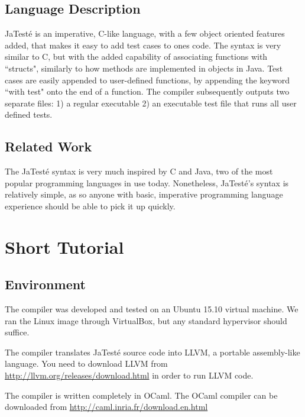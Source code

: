 \documentclass{article}
\begin{document}
\subsection {Language Description}
JaTest\'{e} is an imperative, C-like language, with a few object oriented features added, that makes it easy to add test cases to ones code. The syntax is very similar to C, but with the added capability of associating functions with ``structs", similarly to how methods are implemented in objects in Java. Test cases are easily appended to user-defined functions, by appending the keyword ``with test" onto the end of a function. The compiler subsequently outputs two separate files: 1) a regular executable 2) an executable test file that runs all user defined tests.

\subsection{Related Work}
The JaTest\'{e} syntax is very much inspired by C and Java, two of the most popular programming languages in use today. Nonetheless, JaTest\'{e}'s syntax is relatively simple, as so anyone with basic, imperative programming language experience should be able to pick it up quickly.

\newpage

\section{Short Tutorial}
\subsection{Environment}
The compiler was developed and tested on an Ubuntu 15.10 virtual machine. We ran the Linux image through VirtualBox, but any standard hypervisor should suffice.
\par
The compiler translates JaTest\'{e} source code into LLVM, a portable assembly-like language. You need to download LLVM from \url{http://llvm.org/releases/download.html} in order to run LLVM code.
\par
The compiler is written completely in OCaml. The OCaml compiler can be downloaded from \url{http://caml.inria.fr/download.en.html}
\end{document}
